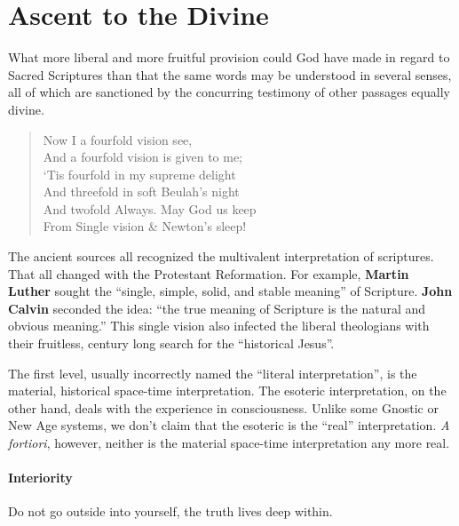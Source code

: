 \section{Ascent to the Divine}

\begin{quotex}
What more liberal and more fruitful provision could God have made in regard to Sacred Scriptures than that the same words may be understood in several senses, all of which are sanctioned by the concurring testimony of other passages equally divine.

\begin{verse}
Now I a fourfold vision see,\\ And a fourfold vision is given to me;\\ `Tis fourfold in my supreme delight\\ And threefold in soft Beulah's night\\ And twofold Always. May God us keep\\ From Single vision \& Newton's sleep!
\end{verse}
\end{quotex}


The ancient sources all recognized the multivalent interpretation of scriptures. That all changed with the Protestant Reformation. For example, \textbf{Martin} \textbf{Luther} sought the ``single, simple, solid, and stable meaning'' of Scripture. \textbf{John Calvin} seconded the idea: ``the true meaning of Scripture is the natural and obvious meaning.'' This single vision also infected the liberal theologians with their fruitless, century long search for the ``historical Jesus''.

The first level, usually incorrectly named the ``literal interpretation'', is the material, historical space-time interpretation. The esoteric interpretation, on the other hand, deals with the experience in consciousness. Unlike some Gnostic or New Age systems, we don't claim that the esoteric is the ``real'' interpretation. \emph{A fortiori}, however, neither is the material space-time interpretation any more real.

\paragraph{Interiority}


\begin{quotex}
Do not go outside into yourself, the truth lives deep within.
\end{quotex}


